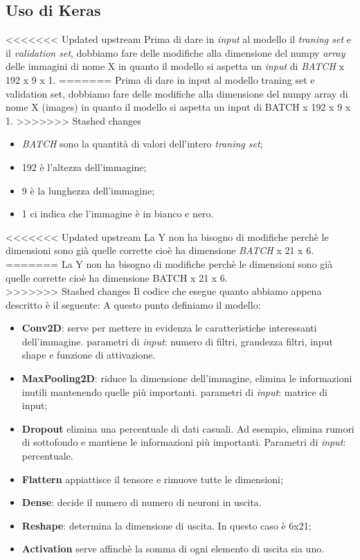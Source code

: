 \subsection{Uso di Keras}
<<<<<<< Updated upstream
Prima di dare in \textit{input} al modello il \textit{traning set} e il \textit{validation set}, dobbiamo fare delle modifiche alla dimensione del numpy \textit{array} delle immagini di nome X in quanto il modello si aspetta un \textit{input} di \textit{BATCH} x 192 x 9 x 1.
=======
Prima di dare in input al modello traning set e validation set, dobbiamo fare delle modifiche alla dimensione del numpy array di nome X (images) in quanto il modello si aspetta un input di BATCH x 192 x 9 x 1.
>>>>>>> Stashed changes
\begin{itemize}
	\item \textit{BATCH} sono la quantità di valori dell'intero \textit{traning set};
	\item 192 è l'altezza dell'immagine;
	\item 9 è la lunghezza dell'immagine;
	\item 1 ci indica che l'immagine è in bianco e nero.
\end{itemize}
<<<<<<< Updated upstream
La Y non ha bisogno di modifiche perchè le dimensioni sono già quelle corrette cioè ha dimensione \textit{BATCH} x 21 x 6.\\
\newline
=======
La Y non ha bisogno di modifiche perchè le dimensioni sono già quelle corrette cioè ha dimensione BATCH x 21 x 6.\\
>>>>>>> Stashed changes
Il codice che esegue quanto abbiamo appena descritto è il seguente:
\vspace*{2ex}
\vspace*{2ex}
A questo punto definiamo il modello:
\begin{itemize}
	\item \textbf{Conv2D}: serve per mettere in evidenza le caratteristiche interessanti dell'immagine. parametri di \textit{input}: numero di filtri, grandezza filtri, input shape e funzione di attivazione.
	\item \textbf{MaxPooling2D}: riduce la dimensione dell'immagine, elimina le informazioni inutili mantenendo quelle più importanti. parametri di \textit{input}: matrice di input;
	\item \textbf{Dropout} elimina una percentuale di dati casuali. Ad esempio, elimina rumori di sottofondo e mantiene le informazioni più importanti. Parametri di \textit{input}: percentuale.
	\item \textbf{Flattern} appiattisce il tensore e rimuove tutte le dimensioni;
	\item \textbf{Dense}: decide il numero di numero di neuroni in uscita.
	\item \textbf{Reshape}: determina la dimensione di uscita. In questo caso è 6x21;
	\item \textbf{Activation} serve affinchè la somma di ogni elemento di uscita sia uno.
\end{itemize}
